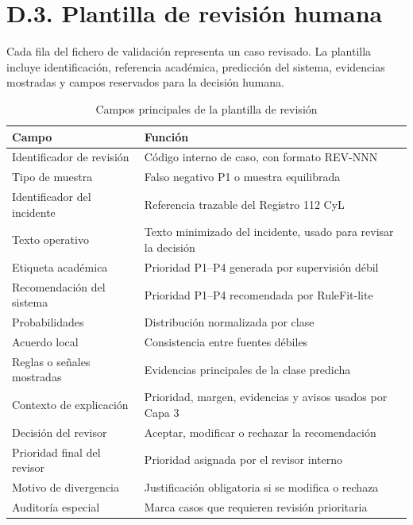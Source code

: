 \section*{D.3. Plantilla de revisión humana}

Cada fila del fichero de validación representa un caso revisado. La plantilla incluye
identificación, referencia académica, predicción del sistema, evidencias mostradas y
campos reservados para la decisión humana.

\begin{table}[ht]
\centering
\caption{Campos principales de la plantilla de revisión}
\label{tab:anexod-plantilla}
\scriptsize
\begin{tabularx}{\textwidth}{|p{3.5cm}|X|}
\hline
\textbf{Campo} & \textbf{Función} \\ \hline
Identificador de revisión & Código interno de caso, con formato REV-NNN \\ \hline
Tipo de muestra & Falso negativo P1 o muestra equilibrada \\ \hline
Identificador del incidente & Referencia trazable del Registro 112 CyL \\ \hline
Texto operativo & Texto minimizado del incidente, usado para revisar la decisión \\ \hline
Etiqueta académica & Prioridad P1--P4 generada por supervisión débil \\ \hline
Recomendación del sistema & Prioridad P1--P4 recomendada por RuleFit-lite \\ \hline
Probabilidades & Distribución normalizada por clase \\ \hline
Acuerdo local & Consistencia entre fuentes débiles \\ \hline
Reglas o señales mostradas & Evidencias principales de la clase predicha \\ \hline
Contexto de explicación & Prioridad, margen, evidencias y avisos usados por Capa 3 \\ \hline
Decisión del revisor & Aceptar, modificar o rechazar la recomendación \\ \hline
Prioridad final del revisor & Prioridad asignada por el revisor interno \\ \hline
Motivo de divergencia & Justificación obligatoria si se modifica o rechaza \\ \hline
Auditoría especial & Marca casos que requieren revisión prioritaria \\ \hline
\end{tabularx}
\end{table}

